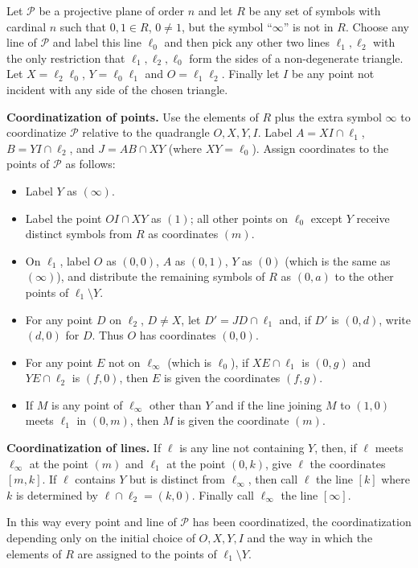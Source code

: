 Let $\mathcal{P}$ be a projective plane of order $n$ and let $R$ be any set of symbols with cardinal $n$ such that $0, 1 \in R$, $0 \neq 1$, but the symbol ``$\infty$'' is not in $R$. Choose any line of $\mathcal{P}$ and label this line $\ell_0$ and then pick any other two lines $\ell_1, \ell_2$ with the only restriction that $\ell_1, \ell_2, \ell_0$ form the sides of a non-degenerate triangle. Let $X = \ell_2 \ell_0$, $Y = \ell_0 \ell_1$ and $O = \ell_1 \ell_2$. Finally let $I$ be any point not incident with any side of the chosen triangle.

\textbf{Coordinatization of points.} Use the elements of $R$ plus the extra symbol $\infty$ to coordinatize $\mathcal{P}$ relative to the quadrangle $O, X, Y, I$. Label $A = XI \cap \ell_1$, $B = YI \cap \ell_2$, and $J = AB \cap XY$ (where $XY = \ell_0$). Assign coordinates to the points of $\mathcal{P}$ as follows:

\begin{itemize}
\item Label $Y$ as $(\infty)$.
\item Label the point $OI \cap XY$ as $(1)$; all other points on $\ell_0$ except $Y$ receive distinct symbols from $R$ as coordinates $(m)$.
\item On $\ell_1$, label $O$ as $(0,0)$, $A$ as $(0,1)$, $Y$ as $(0)$ (which is the same as $(\infty)$), and distribute the remaining symbols of $R$ as $(0,a)$ to the other points of $\ell_1 \setminus Y$.
\item For any point $D$ on $\ell_2$, $D \neq X$, let $D' = JD \cap \ell_1$ and, if $D'$ is $(0,d)$, write $(d,0)$ for $D$. Thus $O$ has coordinates $(0,0)$.
\item For any point $E$ not on $\ell_\infty$ (which is $\ell_0$), if $XE \cap \ell_1$ is $(0,g)$ and $YE \cap \ell_2$ is $(f,0)$, then $E$ is given the coordinates $(f,g)$.
\item If $M$ is any point of $\ell_\infty$ other than $Y$ and if the line joining $M$ to $(1,0)$ meets $\ell_1$ in $(0,m)$, then $M$ is given the coordinate $(m)$.
\end{itemize}

\textbf{Coordinatization of lines.} If $\ell$ is any line not containing $Y$, then, if $\ell$ meets $\ell_\infty$ at the point $(m)$ and $\ell_1$ at the point $(0,k)$, give $\ell$ the coordinates $[m,k]$. If $\ell$ contains $Y$ but is distinct from $\ell_\infty$, then call $\ell$ the line $[k]$ where $k$ is determined by $\ell \cap \ell_2 = (k,0)$. Finally call $\ell_\infty$ the line $[\infty]$.

In this way every point and line of $\mathcal{P}$ has been coordinatized, the coordinatization depending only on the initial choice of $O, X, Y, I$ and the way in which the elements of $R$ are assigned to the points of $\ell_1 \setminus Y$.
